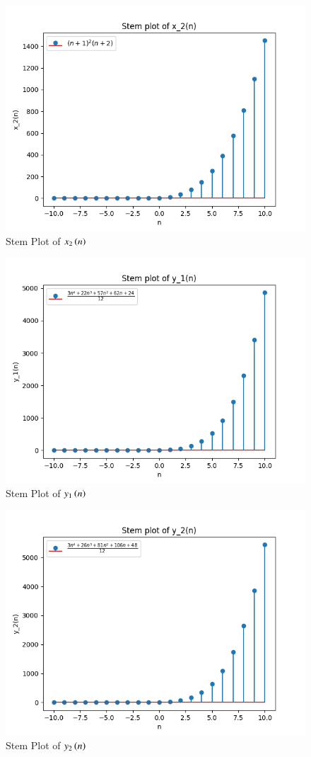 \documentclass[journal,12pt,twocolumn]{IEEEtran}
\theoremstyle{remark}
\begin{document}
\begin{figure}[htbp]
    \centering
    \includegraphics[width=1\columnwidth]{x2_plot.png}
    \caption{Stem Plot of $x_2\left(n\right)$}
    \label{fig:x2}
\end{figure}

\begin{figure}[htbp]
    \centering
    \includegraphics[width=1\columnwidth]{y1_plot.png}
    \caption{Stem Plot of $y_1\left(n\right)$}
    \label{fig:y1}
\end{figure}

\begin{figure}[htbp]
    \centering
    \includegraphics[width=1\columnwidth]{y2_plot.png}
    \caption{Stem Plot of $y_2\left(n\right)$}
    \label{fig:y2}
\end{figure}
\end{document}
